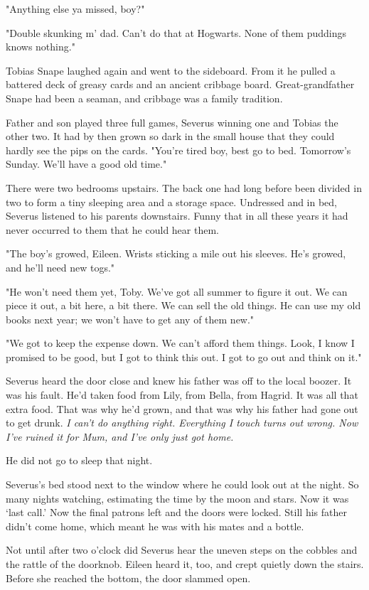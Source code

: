 \documentclass[a4paper,11pt]{article}
\begin{document}
"Anything else ya missed, boy?"

"Double skunking m' dad. Can't do that at Hogwarts. None of them puddings knows nothing."

Tobias Snape laughed again and went to the sideboard. From it he pulled a battered deck of greasy cards and an ancient cribbage board. Great-grandfather Snape had been a seaman, and cribbage was a family tradition.

Father and son played three full games, Severus winning one and Tobias the other two. It had by then grown so dark in the small house that they could hardly see the pips on the cards. "You're tired boy, best go to bed. Tomorrow's Sunday. We'll have a good old time."

There were two bedrooms upstairs. The back one had long before been divided in two to form a tiny sleeping area and a storage space. Undressed and in bed, Severus listened to his parents downstairs. Funny that in all these years it had never occurred to them that he could hear them.

"The boy's growed, Eileen. Wrists sticking a mile out his sleeves. He's growed, and he'll need new togs."

"He won't need them yet, Toby. We've got all summer to figure it out. We can piece it out, a bit here, a bit there. We can sell the old things. He can use my old books next year; we won't have to get any of them new."

"We got to keep the expense down. We can't afford them things. Look, I know I promised to be good, but I got to think this out. I got to go out and think on it."

Severus heard the door close and knew his father was off to the local boozer. It was his fault. He'd taken food from Lily, from Bella, from Hagrid. It was all that extra food. That was why he'd grown, and that was why his father had gone out to get drunk. \emph{I can't do anything right. Everything I touch turns out wrong. Now I've ruined it for Mum, and I've only just got home.}

He did not go to sleep that night.

Severus's bed stood next to the window where he could look out at the night. So many nights watching, estimating the time by the moon and stars. Now it was `last call.' Now the final patrons left and the doors were locked. Still his father didn't come home, which meant he was with his mates and a bottle.

Not until after two o'clock did Severus hear the uneven steps on the cobbles and the rattle of the doorknob. Eileen heard it, too, and crept quietly down the stairs. Before she reached the bottom, the door slammed open.
\end{document}

